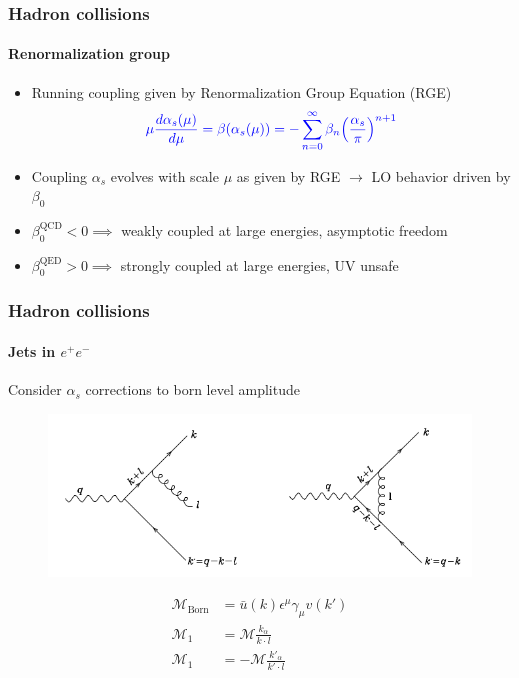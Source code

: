 \documentclass[aspectratio=43]{beamer}
\begin{document}
\begin{frame}

	\frametitle{Hadron collisions}
	\framesubtitle{Renormalization group}
	
	\begin{itemize}
		\item Running coupling given by Renormalization Group Equation (RGE)
		\begin{equation}
		{\color{blue}\mu\frac{d\alpha_{s}(\mu)}{d\mu} = \beta(\alpha_{s}(\mu)) = -\sum_{n = 0}^{\infty} \beta_{n} \Big( \frac{\alpha_{s}}{\pi} \Big)^{n + 1}} \nonumber
		\end{equation}
		\item Coupling {\color{blue}$\alpha_{s}$} evolves with scale {\color{blue}$\mu$} as given by RGE $\rightarrow$ LO behavior driven by $\beta_{0}$
		\item $\beta_{0}^{\textrm{QCD}} < 0 \implies$ weakly coupled at large energies, asymptotic freedom
		\item $\beta_{0}^{\textrm{QED}} > 0 \implies$ strongly coupled at large energies, UV unsafe
		
	\end{itemize}

\end{frame}

\begin{frame}
	
	\frametitle{Hadron collisions}
	\framesubtitle{Jets in $e^{+}e^{-}$}
	
	Consider $\alpha_{s}$ corrections to born level amplitude
	
	\begin{figure}
		\includegraphics[width = 7 cm]{plots/qcd_corrections_2.png}
	\end{figure}

	\begin{align}
		\mathcal{M}_{\textrm{Born}} &= \bar{u}(k)\epsilon^{\mu}\gamma_{\mu}v(k') \nonumber \\
		\mathcal{M}_{1} &= \mathcal{M} \frac{k_{\alpha}}{k \cdot l} \nonumber \\
		\mathcal{M}_{1} &= -\mathcal{M} \frac{k'_{\alpha}}{k' \cdot l} \nonumber		 
	\end{align}

\end{frame}
\end{document}

